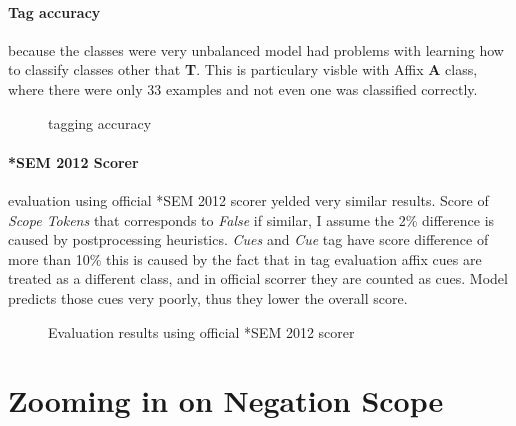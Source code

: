 \documentclass{article}
\begin{document}
\paragraph{Tag accuracy} because the classes were very unbalanced model had problems
with learning how to classify classes other that \textbf{T}. This is particulary visble
with Affix \textbf{A} class, where there were only 33 examples and not even one was classified
correctly.
\begin{figure}[h]
    \begin{subfigure}{0.45\textwidth}
        \centering
        \scalebox{0.8}{}
    \end{subfigure}
    \hfill
    \begin{subfigure}{0.45\textwidth}
        \centering
        \scalebox{0.8}{}
    \end{subfigure}
    \caption{tagging accuracy}
    \end{figure}
\paragraph{*SEM 2012 Scorer} evaluation using official *SEM 2012 scorer yelded very similar results.
Score of \textit{Scope Tokens} that corresponds to \textit{False} if similar, I assume the 2\% difference
is caused by postprocessing heuristics. \textit{Cues} and \textit{Cue} tag have score difference of more
than 10\% this is caused by the fact that in tag evaluation affix cues are treated as a different class, and
in official scorrer they are counted as cues. Model predicts those cues very poorly, thus they lower the
overall score.

\begin{figure}[h]
\begin{subfigure}{\textwidth}
    \centering
    
    \vspace*{3mm}
\end{subfigure}
\begin{subfigure}{\textwidth}
    \centering
    
\end{subfigure}
\caption{Evaluation results using official *SEM 2012 scorer}
\end{figure}

\section{Zooming in on Negation Scope}
\end{document}
